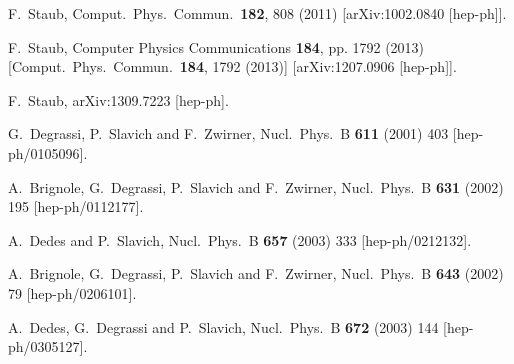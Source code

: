 \documentclass[final,3p,11pt,pdflatex]{elsarticle}
\begin{document}
\begin{thebibliography}{100}
  F.~Staub,
  Comput.\ Phys.\ Commun.\  {\bf 182}, 808 (2011)
  [arXiv:1002.0840 [hep-ph]].

  F.~Staub,
  Computer Physics Communications {\bf 184}, pp. 1792 (2013)
  [Comput.\ Phys.\ Commun.\  {\bf 184}, 1792 (2013)]
  [arXiv:1207.0906 [hep-ph]].

  F.~Staub,
  arXiv:1309.7223 [hep-ph].

  G.~Degrassi, P.~Slavich and F.~Zwirner,
  Nucl.\ Phys.\ B {\bf 611} (2001) 403
  [hep-ph/0105096].

  A.~Brignole, G.~Degrassi, P.~Slavich and F.~Zwirner,
  Nucl.\ Phys.\ B {\bf 631} (2002) 195
  [hep-ph/0112177].

  A.~Dedes and P.~Slavich,
  Nucl.\ Phys.\ B {\bf 657} (2003) 333
  [hep-ph/0212132].

  A.~Brignole, G.~Degrassi, P.~Slavich and F.~Zwirner,
  Nucl.\ Phys.\ B {\bf 643} (2002) 79
  [hep-ph/0206101].

  A.~Dedes, G.~Degrassi and P.~Slavich,
  Nucl.\ Phys.\ B {\bf 672} (2003) 144
  [hep-ph/0305127].


\end{thebibliography}
\end{document}
